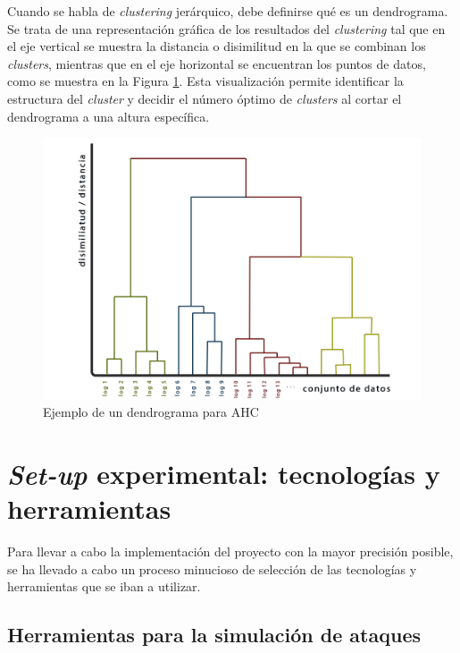 Cuando se habla de \textit{clustering} jerárquico, debe definirse qué es un dendrograma. Se trata de una representación gráfica de los resultados del \textit{clustering} tal que en el eje vertical se muestra la distancia o disimilitud en la que se combinan los \textit{clusters}, mientras que en el eje horizontal se encuentran los puntos de datos, como se muestra en la Figura \ref{fig:dendrogram-example}. Esta visualización permite identificar la estructura del \textit{cluster} y decidir el número óptimo de \textit{clusters} al cortar el dendrograma a una altura específica.

\begin{figure}[H]
    \centering
    \includegraphics[width=0.8\linewidth]{imagenes/dendrograma.png}
    \caption{Ejemplo de un dendrograma para \gls{AHC}}
    \label{fig:dendrogram-example}
\end{figure}

\newpage


\section{\textit{Set-up} experimental: tecnologías y herramientas}

\vspace{-1mm}

Para llevar a cabo la implementación del proyecto con la mayor precisión posible, se ha llevado a cabo un proceso minucioso de selección de las tecnologías y herramientas que se iban a utilizar.

\subsection{Herramientas para la simulación de ataques}

